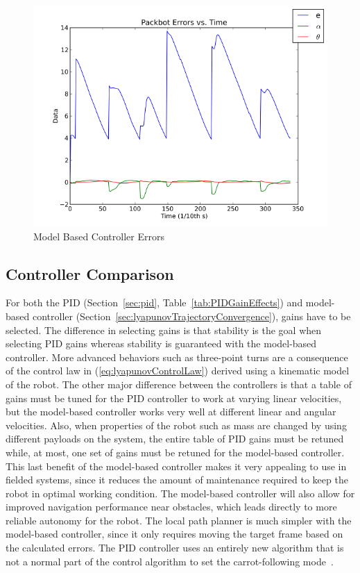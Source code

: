 \begin{figure}[ht!]
\centering
\includegraphics[width=.5\textwidth]{images/pbtx/20110113_1451_pbtx_simpleDriveErrors}
\caption{Model Based Controller Errors}
\label{fig:mbErrors}
\end{figure}

\subsection{Controller Comparison}
\label{sec:controllerComparison}
For both the PID (Section~\ref{sec:pid}, Table~\ref{tab:PIDGainEffects}) and model-based controller (Section~\ref{sec:lyapunovTrajectoryConvergence}), gains have to be selected. The difference in selecting gains is that stability is the goal when selecting PID gains whereas stability is guaranteed with the model-based controller. More advanced behaviors such as three-point turns are a consequence of the control law in (\ref{eq:lyapunovControlLaw}) derived using a kinematic model of the robot. The other major difference between the controllers is that a table of gains must be tuned for the PID controller to work at varying linear velocities, but the model-based controller works very well at different linear and angular velocities. Also, when properties of the robot such as mass are changed by using different payloads on the system, the entire table of PID gains must be retuned while, at most, one set of gains must be retuned for the model-based controller. This last benefit of the model-based controller makes it very appealing to use in fielded systems, since it reduces the amount of maintenance required to keep the robot in optimal working condition. The model-based controller will also allow for improved navigation performance near obstacles, which leads directly to more reliable autonomy for the robot. The local path planner is much simpler with the model-based controller, since it only requires moving the target frame based on the calculated errors. The PID controller uses an entirely new algorithm that is not a normal part of the control algorithm to set the carrot-following mode~\cite{Hogg02}.


